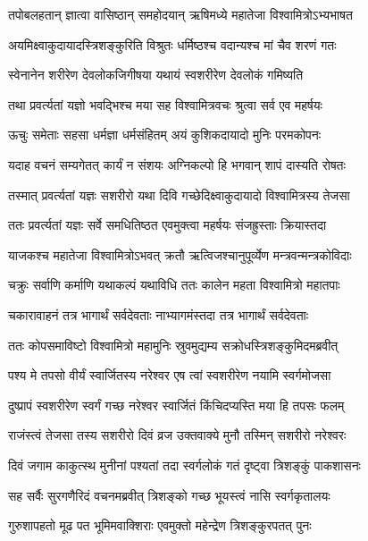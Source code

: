 
\twolineshloka
{तपोबलहतान् ज्ञात्वा वासिष्ठान् समहोदयान्}
{ऋषिमध्ये महातेजा विश्वामित्रोऽभ्यभाषत} %

\twolineshloka
{अयमिक्ष्वाकुदायादस्त्रिशङ्कुरिति विश्रुतः}
{धर्मिष्ठश्च वदान्यश्च मां चैव शरणं गतः} %

\twolineshloka
{स्वेनानेन शरीरेण देवलोकजिगीषया}
{यथायं स्वशरीरेण देवलोकं गमिष्यति} %

\twolineshloka
{तथा प्रवर्त्यतां यज्ञो भवद्भिश्च मया सह}
{विश्वामित्रवचः श्रुत्वा सर्व एव महर्षयः} %

\twolineshloka
{ऊचुः समेताः सहसा धर्मज्ञा धर्मसंहितम्}
{अयं कुशिकदायादो मुनिः परमकोपनः} %

\twolineshloka
{यदाह वचनं सम्यगेतत् कार्यं न संशयः}
{अग्निकल्पो हि भगवान् शापं दास्यति रोषतः} %

\twolineshloka
{तस्मात् प्रवर्त्यतां यज्ञः सशरीरो यथा दिवि}
{गच्छेदिक्ष्वाकुदायादो विश्वामित्रस्य तेजसा} %

\twolineshloka
{ततः प्रवर्त्यतां यज्ञः सर्वे समधितिष्ठत}
{एवमुक्त्वा महर्षयः संजह्रुस्ताः क्रियास्तदा} %

\twolineshloka
{याजकश्च महातेजा विश्वामित्रोऽभवत् क्रतौ}
{ऋत्विजश्चानुपूर्व्येण मन्त्रवन्मन्त्रकोविदाः} %

\twolineshloka
{चक्रुः सर्वाणि कर्माणि यथाकल्पं यथाविधि}
{ततः कालेन महता विश्वामित्रो महातपाः} %

\twolineshloka
{चकारावाहनं तत्र भागार्थं सर्वदेवताः}
{नाभ्यागमंस्तदा तत्र भागार्थं सर्वदेवताः} %

\twolineshloka
{ततः कोपसमाविष्टो विश्वामित्रो महामुनिः}
{स्रुवमुद्यम्य सक्रोधस्त्रिशङ्कुमिदमब्रवीत्} %

\twolineshloka
{पश्य मे तपसो वीर्यं स्वार्जितस्य नरेश्वर}
{एष त्वां स्वशरीरेण नयामि स्वर्गमोजसा} %

\twolineshloka
{दुष्प्रापं स्वशरीरेण स्वर्गं गच्छ नरेश्वर}
{स्वार्जितं किंचिदप्यस्ति मया हि तपसः फलम्} %

\twolineshloka
{राजंस्त्वं तेजसा तस्य सशरीरो दिवं व्रज}
{उक्तवाक्ये मुनौ तस्मिन् सशरीरो नरेश्वरः} %

\twolineshloka
{दिवं जगाम काकुत्स्थ मुनीनां पश्यतां तदा}
{स्वर्गलोकं गतं दृष्ट्वा त्रिशङ्कुं पाकशासनः} %

\twolineshloka
{सह सर्वैः सुरगणैरिदं वचनमब्रवीत्}
{त्रिशङ्को गच्छ भूयस्त्वं नासि स्वर्गकृतालयः} %

\twolineshloka
{गुरुशापहतो मूढ पत भूमिमवाक्शिराः}
{एवमुक्तो महेन्द्रेण त्रिशङ्कुरपतत् पुनः} %

